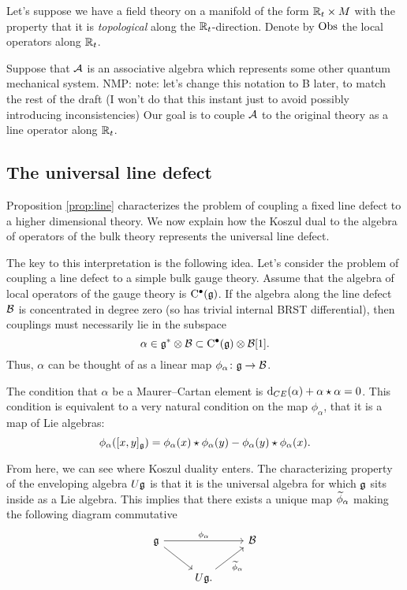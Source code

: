 \documentclass[11pt]{amsart}
\def\natalie#1{{\textcolor{green!65!black}{NMP: {#1}}}}
\begin{document}
Let's suppose we have a field theory on a manifold of the form $\mathbb R_t \times M$ with the property that it is {\em topological} along the $\mathbb R_t$-direction. 
Denote by ${\rm Obs}$ the local operators along $\mathbb R_t$. 

Suppose that $\mathcal A$ is an associative algebra which represents some other quantum mechanical system. \natalie{note: let's change this notation to B later, to match the rest of the draft (I won't do that this instant just to avoid possibly introducing inconsistencies)}
Our goal is to couple $\mathcal A$ to the original theory as a line operator along $\mathbb R_t$. 

\subsection{The universal line defect}
\label{sec:univ}

Proposition \ref{prop:line} characterizes the problem of coupling a fixed line defect to a higher dimensional theory. 
We now explain how the Koszul dual to the algebra of operators of the bulk theory represents the universal line defect. 

The key to this interpretation is the following idea.
Let's consider the problem of coupling a line defect to a simple bulk gauge theory. 
Assume that the algebra of local operators of the gauge theory is ${\rm C}^\bullet(\mathfrak g)$.
If the algebra along the line defect $\mathcal B$ is concentrated in degree zero (so has trivial internal BRST differential), then couplings must necessarily lie in the subspace
\[
\alpha \in \mathfrak g^* \otimes \mathcal B \subset {\rm C}^\bullet(\mathfrak g) \otimes \mathcal B [1] .
\]
Thus, $\alpha$ can be thought of as a linear map $\phi_\alpha \colon \mathfrak g \to \mathcal B$. 

The condition that $\alpha$ be a Maurer--Cartan element is ${\rm d}_{CE} (\alpha) + \alpha \star \alpha = 0$.
This condition is equivalent to a very natural condition on the map $\phi_\alpha$, that it is a map of Lie algebras:
\[
\phi_\alpha ([x,y]_\mathfrak g) = \phi_\alpha(x) \star \phi_\alpha(y) - \phi_\alpha(y) \star \phi_\alpha(x) .
\]

From here, we can see where Koszul duality enters. 
The characterizing property of the enveloping algebra $U \mathfrak g$ is that it is the universal algebra for which $\mathfrak g$ sits inside as a Lie algebra. 
This implies that there exists a unique map $\widetilde \phi_\alpha$ making the following diagram commutative
\[
\begin{tikzcd}
\fg \ar[dr] \ar[rr, "\phi_\alpha"] & & \cB \\
& U \fg \ar[ur, "\til \phi_\alpha"'] .
\end{tikzcd}
\]
\end{document}
